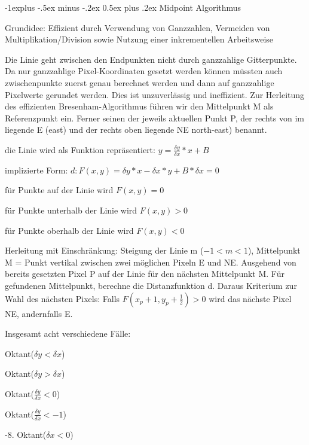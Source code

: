 \documentclass[landscape]{article}
\makeatletter
\renewcommand{\subsection}{\@startsection{subsection}{2}{0mm}%
                                {-1explus -.5ex minus -.2ex}%
                                {0.5ex plus .2ex}%
                                {\normalfont\normalsize\bfseries}}
\makeatother
\begin{document}
\begin{multicols}{3}
  \subsection{ Midpoint Algorithmus}
  \begin{itemize*}
    \item Grundidee: Effizient durch Verwendung von Ganzzahlen, Vermeiden von Multiplikation/Division sowie Nutzung einer inkrementellen Arbeitsweise
    \item Die Linie geht zwischen den Endpunkten nicht durch ganzzahlige Gitterpunkte. Da nur ganzzahlige Pixel-Koordinaten gesetzt werden können müssten auch zwischenpunkte zuerst genau berechnet werden und dann auf ganzzahlige Pixelwerte gerundet werden. Dies ist unzuverlässig und ineffizient. Zur Herleitung des effizienten Bresenham-Algorithmus führen wir den Mittelpunkt M als Referenzpunkt ein. Ferner seinen der jeweils aktuellen Punkt P, der rechts von im liegende E (east) und der rechts oben liegende NE north-east) benannt.
    \item die Linie wird als Funktion repräsentiert: $y=\frac{\delta y}{\delta x}*x+B$
    \item implizierte Form: $d: F(x,y)=\delta y*x-\delta x*y+B*\delta x = 0$
    \item für Punkte auf der Linie wird $F(x,y)=0$
    \item für Punkte unterhalb der Linie wird $F(x,y)>0$
    \item für Punkte oberhalb der Linie wird $F(x,y)<0$
    \item Herleitung mit Einschränkung: Steigung der Linie m ($-1<m<1$), Mittelpunkt M = Punkt vertikal zwischen zwei möglichen Pixeln E und NE. Ausgehend von bereits gesetzten Pixel P auf der Linie für den nächsten Mittelpunkt M. Für gefundenen Mittelpunkt, berechne die Distanzfunktion d. Daraus Kriterium zur Wahl des nächsten Pixels: Falls $F(x_p + 1, y_p+\frac{1}{2})>0$ wird das nächste Pixel NE, andernfalls E.
    \item Insgesamt acht verschiedene Fälle:
          \begin{enumerate*}
            \item Oktant($\delta y < \delta x$)
            \item Oktant($\delta y > \delta x$)
            \item Oktant($\frac{\delta y}{\delta x}<  0$)
            \item Oktant($\frac{\delta y}{\delta x}< -1$)
            \item -8. Oktant($\delta x < 0$)
          \end{enumerate*}
  \end{itemize*}
  

\end{multicols}
\end{document}
